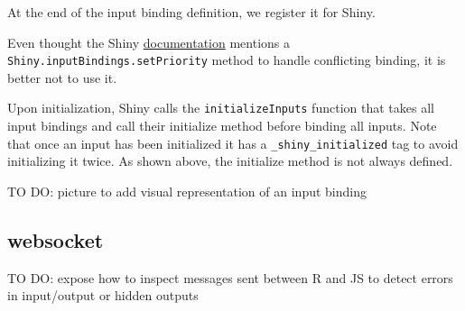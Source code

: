 \documentclass[]{book}
\newenvironment{Shaded}{\begin{snugshade}}{\end{snugshade}}
\newcommand{\AttributeTok}[1]{\textcolor[rgb]{0.77,0.63,0.00}{#1}}
\newcommand{\CommentTok}[1]{\textcolor[rgb]{0.56,0.35,0.01}{\textit{#1}}}
\newcommand{\KeywordTok}[1]{\textcolor[rgb]{0.13,0.29,0.53}{\textbf{#1}}}
\newcommand{\NormalTok}[1]{#1}
\newcommand{\OperatorTok}[1]{\textcolor[rgb]{0.81,0.36,0.00}{\textbf{#1}}}
\newcommand{\StringTok}[1]{\textcolor[rgb]{0.31,0.60,0.02}{#1}}
\newcommand{\VariableTok}[1]{\textcolor[rgb]{0.00,0.00,0.00}{#1}}
\begin{document}
At the end of the input binding definition, we register it for Shiny.

\begin{Shaded}
\end{Shaded}

Even thought the Shiny \href{https://shiny.rstudio.com/articles/building-inputs.html}{documentation} mentions a \texttt{Shiny.inputBindings.setPriority} method to handle conflicting binding, it is better not to use it.

Upon initialization, Shiny calls the \texttt{initializeInputs} function that takes all input bindings and call their initialize method before binding all inputs. Note that once an input has been initialized it has a \texttt{\_shiny\_initialized} tag to avoid initializing it twice. As shown above, the initialize method is not always defined.

TO DO: picture to add visual representation of an input binding

\hypertarget{websocket}{%
\subsection{websocket}\label{websocket}}

TO DO: expose how to inspect messages sent between R and JS to detect errors in input/output or hidden outputs
\end{document}
